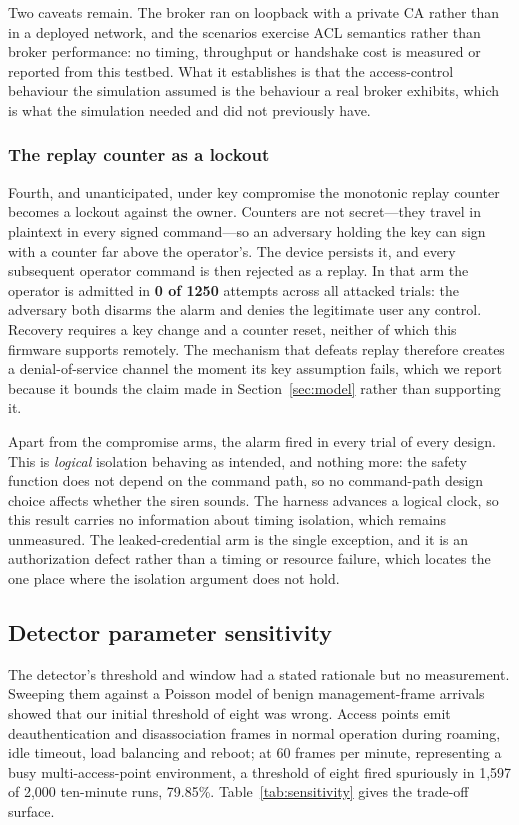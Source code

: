 Two caveats remain. The broker ran on loopback with a private CA rather than in a deployed
network, and the scenarios exercise ACL semantics rather than broker performance: no timing,
throughput or handshake cost is measured or reported from this testbed. What it establishes is
that the access-control behaviour the simulation assumed is the behaviour a real broker
exhibits, which is what the simulation needed and did not previously have.

\subsubsection{The replay counter as a lockout}

Fourth, and unanticipated, under key compromise the monotonic replay counter becomes a lockout
against the owner. Counters are not secret---they travel in plaintext in every signed
command---so an adversary holding the key can sign with a counter far above the operator's. The
device persists it, and every subsequent operator command is then rejected as a replay. In that
arm the operator is admitted in \textbf{0 of 1250} attempts across all attacked trials: the
adversary both disarms the alarm and denies the legitimate user any control. Recovery requires
a key change and a counter reset, neither of which this firmware supports remotely. The
mechanism that defeats replay therefore creates a denial-of-service channel the moment its key
assumption fails, which we report because it bounds the claim made in Section~\ref{sec:model}
rather than supporting it.

Apart from the compromise arms, the alarm fired in every trial of every design. This is
\emph{logical} isolation behaving as intended, and nothing more: the safety function does not
depend on the command path, so no command-path design choice affects whether the siren sounds.
The harness advances a logical clock, so this result carries no information about timing
isolation, which remains unmeasured. The leaked-credential arm is the
single exception, and it is an authorization defect rather than a timing or resource failure,
which locates the one place where the isolation argument does not hold.

\subsection{Detector parameter sensitivity}

The detector's threshold and window had a stated rationale but no measurement. Sweeping them against a Poisson model of benign management-frame arrivals showed that our initial
threshold of eight was wrong. Access points emit deauthentication and disassociation frames in
normal operation during roaming, idle timeout, load balancing and reboot; at 60 frames per minute,
representing a busy multi-access-point environment, a threshold of eight fired spuriously in
1{,}597 of 2{,}000 ten-minute runs, 79.85\%. Table~\ref{tab:sensitivity} gives the trade-off surface.

